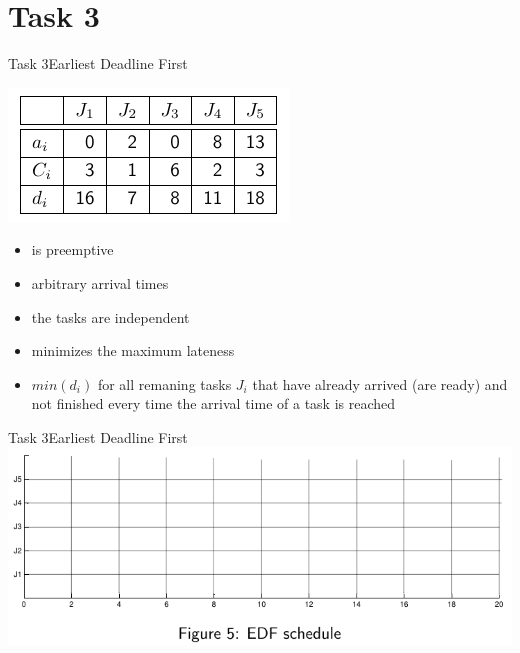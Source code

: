
\section{Task 3}

\setcounter{task}{1}

\begin{frame}[shrink=10]{Task 3}{Earliest Deadline First}
  \vspace{0.5cm}
  \begin{task}
    \centering
    \includegraphics[height=0.2\paperheight]{./figures/3_tab.png}
  \end{task}
  \begin{requirements}
    \begin{itemize}
      \item is \alert{preemptive}
      \item \alert{arbitrary arrival times}
      \item the tasks are \alert{independent}
      \item \alert{minimizes} the \alert{maximum lateness}
      \item $min(d_i)$ for all remaning tasks $J_i$  that have already \alert{arrived} (are ready) and \alert{not finished} \alert{every time} the \alert{arrival time} of a task is reached
    \end{itemize}
  \end{requirements}
\end{frame}

\begin{frame}{Task 3}{Earliest Deadline First}
  \includegraphics[width=\textwidth]{./figures/3_empty.png}
\end{frame}

